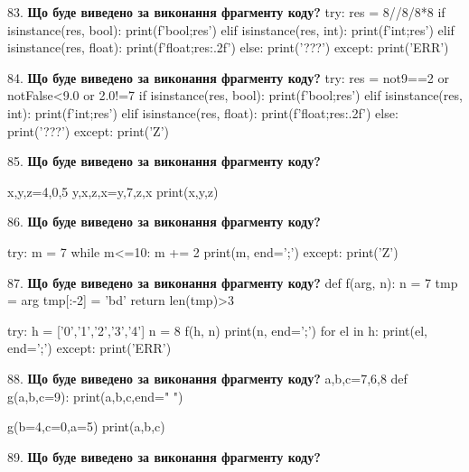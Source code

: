 \documentclass[11pt]{article}
\begin{document}
83. \textbf{Що буде виведено за виконання фрагменту коду?}
try:
    res = 8//8/8*8
    if isinstance(res, bool):
        print(f'bool;{res}')
    elif isinstance(res, int):
        print(f'int;{res}')
    elif isinstance(res, float):
        print(f'float;{res:.2f}')
    else:
        print('???')
except:
    print('ERR')
\par\vspace{5mm}

84. \textbf{Що буде виведено за виконання фрагменту коду?}
try:
    res = not9==2 or notFalse<9.0 or 2.0!=7
    if isinstance(res, bool):
        print(f'bool;{res}')
    elif isinstance(res, int):
        print(f'int;{res}')
    elif isinstance(res, float):
        print(f'float;{res:.2f}')
    else:
        print('???')
except:
    print('Z')
\par\vspace{5mm}

85. \textbf{Що буде виведено за виконання фрагменту коду?}

x,y,z=4,0,5
y,x,z,x=y,7,z,x
print(x,y,z)
\par\vspace{5mm}

86. \textbf{Що буде виведено за виконання фрагменту коду?}

try:
    m = 7
    while m<=10:
        m += 2
    print(m, end=';')
except:
    print('Z')

\par\vspace{5mm}

87. \textbf{Що буде виведено за виконання фрагменту коду?}
def f(arg, n):
    n = 7
    tmp = arg
    tmp[:-2] = 'bd'
    return len(tmp)>3

try:
    h = ['0','1','2','3','4']
    n = 8
    f(h, n)
    print(n, end=';')
    for el in h:
        print(el, end=';')
except:
    print('ERR')
\par\vspace{5mm}

88. \textbf{Що буде виведено за виконання фрагменту коду?}
a,b,c=7,6,8
def g(a,b,c=9):
    print(a,b,c,end=" ")

g(b=4,c=0,a=5)
print(a,b,c)
\par\vspace{5mm}

89. \textbf{Що буде виведено за виконання фрагменту коду?}
\end{document}
